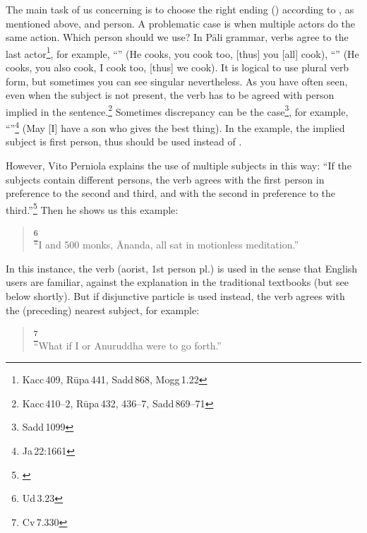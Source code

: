 \label{par:multiactors}The main task of us concerning  is to choose the right ending () according to , as mentioned above, and person. A problematic case is when multiple actors do the same action. Which person should we use? In P\=ali grammar, verbs agree to the last actor\footnote{Kacc\,409, R\=upa\,441, Sadd\,868, Mogg\,1.22}, for example, ``'' (He cooks, you cook too, [thus] you [all] cook), ``'' (He cooks, you also cook, I cook too, [thus] we cook). It is logical to use plural verb form, but sometimes you can see singular nevertheless. As you have often seen, even when the subject is not present, the verb has to be agreed with person implied in the sentence.\footnote{Kacc\,410--2, R\=upa\,432, 436--7, Sadd\,869--71} Sometimes discrepancy can be the case\footnote{Sadd\,1099}, for example, ``''\footnote{Ja\,22:1661} (May [I] have a son who gives the best thing). In the example, the implied subject is first person, thus  should be used instead of .

However, Vito Perniola explains the use of multiple subjects in this way: ``If the subjects contain different persons, the verb agrees with the first person in preference to the second and third, and with the second in preference to the third.''\footnote{\citealp[p.~341]{perniola:grammar}} Then he shows us this example:

\begin{quote}
\footnote{Ud\,3.23}\\
``I and 500 monks, \=Ananda, all sat in motionless meditation.''\\
\end{quote}

In this instance, the verb  (aorist, 1st person pl.) is used in the sense that English users are familiar, against the explanation in the traditional textbooks (but see below shortly). But if disjunctive particle  is used instead, the verb agrees with the (preceding) nearest subject, for example:

\begin{quote}
\footnote{Cv\,7.330}\\
``What if I or Anuruddha were to go forth.''\\
\end{quote}

